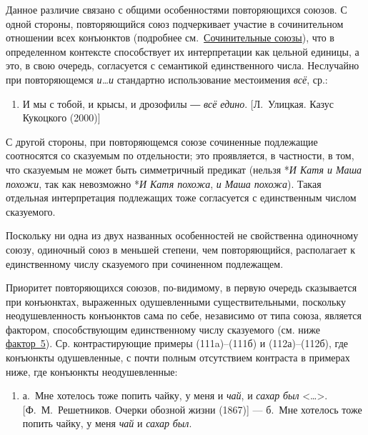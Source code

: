 Данное различие связано с общими особенностями повторяющихся союзов. С
одной стороны, повторяющийся союз подчеркивает участие в сочинительном
отношении всех конъюнктов (подробнее см.~\underline{Сочинительные
  союзы}), что в определенном контексте способствует их интерпретации как
цельной единицы, а это, в свою очередь, согласуется с семантикой
единственного числа. Неслучайно при повторяющемся \textit{и\ldots и}
стандартно использование местоимения \textit{всё}, ср.:

\begin{enumerate}
  \def\labelenumi{(\arabic{enumi})}
  \setcounter{enumi}{112}
  \item
        И мы с тобой, и крысы, и дрозофилы ― \textit{всё едино}. {[}Л.~Улицкая.
        Казус Кукоцкого (2000){]}
\end{enumerate}

С другой стороны, при повторяющемся союзе сочиненные подлежащие
соотносятся со сказуемым по отдельности; это проявляется, в частности, в
том, что сказуемым не может быть симметричный предикат (нельзя *\textit{И
  Катя и Маша похожи}, так как невозможно *\textit{И Катя похожа}, \textit{и
  Маша похожа}). Такая отдельная интерпретация подлежащих тоже согласуется
с единственным числом сказуемого.

Поскольку ни одна из двух названных особенностей не свойственна
одиночному союзу, одиночный союз в меньшей степени, чем повторяющийся,
располагает к единственному числу сказуемого при сочиненном подлежащем.

Приоритет повторяющихся союзов, по-видимому, в первую очередь
сказывается при конъюнктах, выраженных одушевленными существительными,
поскольку неодушевленность конъюнктов сама по себе, независимо от типа
союза, является фактором, способствующим единственному числу сказуемого
(см. ниже \underline{фактор~5}). Ср. контрастирующие примеры
(111a)--(111б) и (112а)--(112б), где конъюнкты одушевленные, с почти
полным отсутствием контраста в примерах ниже, где конъюнкты
неодушевленные:

\begin{enumerate}
  \def\labelenumi{(\arabic{enumi})}
  \setcounter{enumi}{113}
  \item
        а.~Мне хотелось тоже попить чайку, у меня и \textit{чай}, и \textit{сахар}
        \textit{был} \textless\ldots\textgreater. {[}Ф.~М.~Решетников. Очерки
        обозной жизни (1867){]} --- б.~Мне хотелось тоже попить чайку, у меня
        \textit{чай} и \textit{сахар} \textit{был}.
\end{enumerate}

